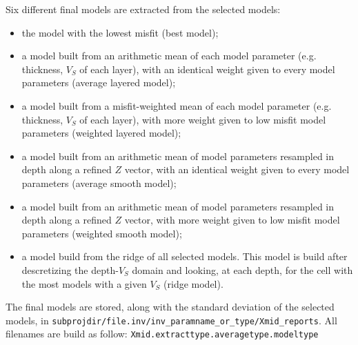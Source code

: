 \documentclass[twoside,a4paper]{article}
\begin{document}
Six different final models are extracted from the selected models:
\begin{itemize}[leftmargin=*]
\setlength\itemsep{2ex}
\item the model with the lowest misfit (best model);
\item a model built from an arithmetic mean of each model parameter (e.g. thickness, $V_S$ of each layer), with an identical weight given to every model parameters (average layered model);
\item a model built from a misfit-weighted mean of each model parameter (e.g. thickness, $V_S$ of each layer), with more weight given to low misfit model parameters (weighted layered model);
\item a model built from an arithmetic mean of model parameters resampled in depth along a refined $Z$ vector, with an identical weight given to every model parameters (average smooth model);
\item a model built from an arithmetic mean of model parameters resampled in depth along a refined $Z$ vector, with more weight given to low misfit model parameters (weighted smooth model);
\item a model build from the ridge of all selected models. This model is build after descretizing the depth-$V_S$ domain and looking, at each depth, for the cell with the most models with a given $V_S$ (ridge model).
\end{itemize}

The final models are stored, along with the standard deviation of the selected models, in \verb|subprojdir/file.inv/inv_paramname_or_type/Xmid_reports|. All filenames are build as follow:
\verb|Xmid.extracttype.averagetype.modeltype|
\end{document}
